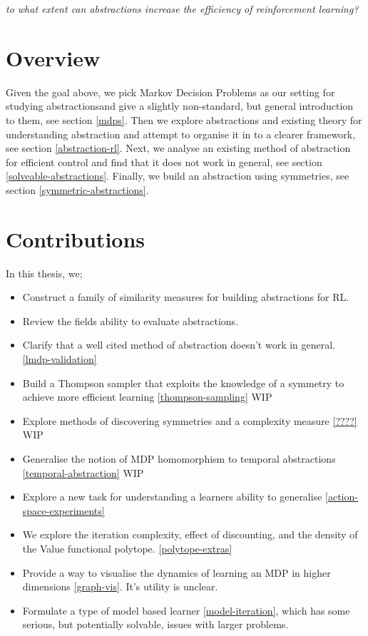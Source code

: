 \begin{displayquote}
\textit{to what extent can abstractions increase the efficiency of reinforcement learning?}
\end{displayquote}

\section{Overview}

Given the goal above, we pick Markov Decision Problems as our setting for studying abstractions\footnotemark[43] and give a slightly non-standard, but general introduction to them, see section \ref{mdps}.
Then we explore abstractions and existing theory for understanding abstraction and attempt to organise it in to a clearer framework, see section \ref{abstraction-rl}.
Next, we analyse an existing method of abstraction for efficient control and find that it does not work in general, see section \ref{solveable-abstractions}.
Finally, we build an abstraction using symmetries, see section \ref{symmetric-abstractions}.


\section{Contributions}

In this thesis, we;

\begin{itemize}
  \tightlist
  \item Construct a family of similarity measures for building abstractions for RL.
  \item Review the fields ability to evaluate abstractions.
  \item Clarify that a well cited method of abstraction doesn't work in general. \ref{lmdp-validation}
  \item Build a Thompson sampler that exploits the knowledge of a symmetry to achieve more efficient learning \ref{thompson-sampling} {\color{red}WIP}
  \item Explore methods of discovering symmetries and a complexity measure \ref{????} {\color{red}WIP}
  \item Generalise the notion of MDP homomorphism to temporal abstractions \ref{temporal-abstraction} {\color{red}WIP}
  \item Explore a new task for understanding a learners ability to generalise \ref{action-space-experiments}
  \item We explore the iteration complexity, effect of discounting, and the density of the Value functional polytope. \ref{polytope-extras}
  \item Provide a way to visualise the dynamics of learning an MDP in higher dimensions \ref{graph-vis}. It's utility is unclear.
  \item Formulate a type of model based learner \ref{model-iteration}, which has some serious, but potentially solvable, issues with larger problems.
\end{itemize}
